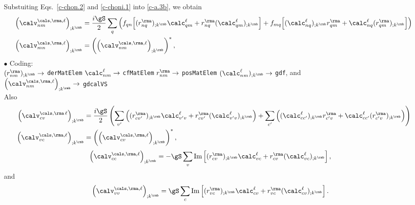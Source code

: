 Substuiting Eqs.~\eqref{c-chon.2} and \eqref{c-choni.1} into \eqref{c-a.3b}, we obtain
\begin{align}\label{c-a.3bnn}
\left(\calv^{\cals,\rma,\ell}_{nm}\right)_{;k^\rmb}
&=
\frac{i\gS}{2}\sum_q\left(
f_{qn}\Big[
(r^\rma_{nq})_{;k^\rmb}\calc^\ell_{qm}
+    
r^\rma_{nq}(\calc^\ell_{qm})_{;k^\rmb}
\Big]
+
f_{mq}\Big[
(\calc^\ell_{nq})_{;k^\rmb} r^\rma_{qm}
+
\calc^\ell_{nq} (r^\rma_{qm})_{;k^\rmb}
\Big]
\right)
\nonumber\\
\left(\calv^{\cals,\rma,\ell}_{mn}\right)_{;k^\rmb}
&=
\left(\left(\calv^{\cals,\rma,\ell}_{nm}\right)_{;k^\rmb}\right)^*
,
\end{align}    
$\bullet$ Coding:\\
$(r^\rma_{nm})_{;k^\rmb}\to$ \verb=derMatElem=
$\calc^\ell_{nm}\to$ \verb=cfMatElem=
$r^\rma_{nm}\to$ \verb=posMatElem=
$(\calc^\ell_{nm})_{;k^\rmb}\to$ \verb=gdf=, and\\
$\left(\calv^{\cals,\rma,\ell}_{nm}\right)_{;k^\rmb}\to$ 
\verb=gdcalVS=\\
Also
\begin{align}\label{dgvs.cv}
\left(\calv^{\cals,\rma\,\ell}_{cv}\right)_{;k^\rmb}
&=
\frac{i\gS}{2}
\left(
\sum_{v'}\left(
 (r^\rma_{cv'})_{;k^\rmb}\calc^\ell_{v'v}
+  
r^\rma_{cv'}(\calc^\ell_{v'v})_{;k^\rmb}
\right)
+
\sum_{c'}\left(
(\calc^\ell_{cc'})_{;k^\rmb} r^\rma_{c'v}
+
\calc^\ell_{cc'} (r^\rma_{c'v})_{;k^\rmb}
\right)
\right)
\nonumber\\
\left(\calv^{\cals,\rma,\ell}_{vc}\right)_{;k^\rmb}
&=
\left(\left(\calv^{\cals,\rma,\ell}_{cv}\right)_{;k^\rmb}\right)^*
,
\end{align}  
\begin{align}\label{dgvs.cc}
\left(\calv^{\cals,\rma,\ell}_{cc}\right)_{;k^\rmb}
&=
-\gS
\sum_{v}
 \mathrm{Im}\left[(r^\rma_{cv})_{;k^\rmb}\calc^\ell_{vc}
+
r^\rma_{cv}
(\calc^\ell_{vc}) _{;k^\rmb}\right]
,
\end{align}  
and
\begin{align}\label{dgvs.vv}
\left(\calv^{\cals,\rma,\ell}_{vv}\right)_{;k^\rmb}
&=
\gS
\sum_{c}
 \mathrm{Im}\left[(r^\rma_{vc})_{;k^\rmb}\calc^\ell_{cv}
+
r^\rma_{vc}(\calc^\ell_{cv}) _{;k^\rmb}\right]
.
\end{align}  


